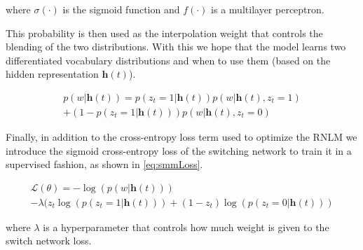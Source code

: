 where $\sigma(\cdot)$ is the sigmoid function and $f(\cdot)$ is a multilayer perceptron.

This probability is then used as the interpolation weight that controls the blending of the two distributions. With this we hope that the model learns two differentiated vocabulary distributions and when to use them (based on the hidden representation $\mathbf{h}(t)$). 

\begin{equation} \label{eq:smm}
	\begin{gathered}
		p(w|\mathbf{h}(t)) = p(z_t=1|\mathbf{h}(t))p(w|\mathbf{h}(t), z_t=1) \\
		+ (1-p(z_t=1|\mathbf{h}(t)))p(w|\mathbf{h}(t), z_t=0)
	\end{gathered}
\end{equation}

Finally, in addition to the cross-entropy loss term used to optimize the RNLM we introduce the sigmoid cross-entropy loss of the switching network to train it in a supervised fashion, as shown in \autoref{eq:smmLoss}.

\begin{equation} \label{eq:smmLoss}
	\begin{gathered}
		\mathcal{L}(\theta) = -\log(p(w|\mathbf{h}(t))) \\
		- \lambda(z_t\log(p(z_t=1|\mathbf{h}(t))) + (1 - z_t)\log(p(z_t=0|\mathbf{h}(t)))
	\end{gathered}
\end{equation}

where $\lambda$ is a hyperparameter that controls how much weight is given to the switch network loss.
